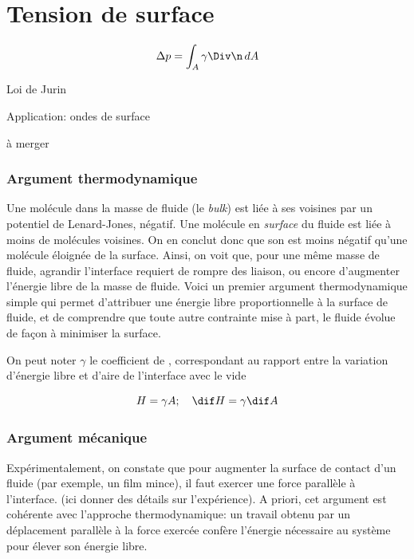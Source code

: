 \chapter{Tension de surface}

\begin{displaymath}
  \Delta p = \int_A \gamma \Div \n\,dA
\end{displaymath}

Loi de Jurin

Application: ondes de surface

à merger

\subsection{Argument thermodynamique}

Une molécule dans la masse de fluide (le \emph{bulk}) est liée à ses voisines par  un potentiel de Lenard-Jones, négatif. Une molécule en \emph{surface} du fluide est liée à moins de molécules voisines. On en conclut donc que son  est moins négatif qu'une molécule éloignée de la surface. Ainsi, on voit que, pour une même masse de fluide, agrandir l'interface requiert de rompre des liaison, ou encore d'augmenter l'énergie libre de la masse de fluide. Voici un premier argument thermodynamique simple qui permet d'attribuer une énergie libre proportionnelle à la surface de fluide, et de comprendre que toute autre contrainte mise à part, le fluide évolue de façon à minimiser la surface. 

On peut noter $\gamma$ le coefficient de , correspondant au rapport entre la variation d'énergie libre et d'aire de l'interface avec le vide

\begin{displaymath}
  H = \gamma A;\quad \dif H = \gamma \dif A
\end{displaymath}


\subsection{Argument mécanique}

Expérimentalement, on constate que pour augmenter la surface de contact d'un fluide (par exemple, un film mince), il faut exercer une force parallèle à l'interface. (ici donner des détails sur l'expérience). A priori, cet argument est cohérente avec l'approche thermodynamique: un travail obtenu par un déplacement parallèle à la force exercée confère l'énergie nécessaire au système pour élever son énergie libre. 

